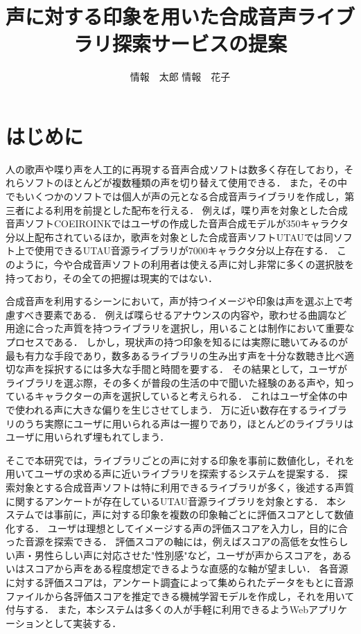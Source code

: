 \documentclass[a4j,8pt,twocolumn]{extarticle}
\title{声に対する印象を用いた合成音声ライブラリ探索サービスの提案}
\author{情報　太郎 \qquad 情報　花子}
\affiliation{情報大学情報学部}
\begin{document}
\maketitle
\thispagestyle{empty}	%


\section{はじめに}

人の歌声や喋り声を人工的に再現する音声合成ソフトは数多く存在しており，それらソフトのほとんどが複数種類の声を切り替えて使用できる．
また，その中でもいくつかのソフトでは個人が声の元となる合成音声ライブラリを作成し，第三者による利用を前提とした配布を行える．
例えば，喋り声を対象とした合成音声ソフトCOEIROINKではユーザの作成した音声合成モデルが350キャラクタ分以上配布されているほか\cite{mycoeiroink}，歌声を対象とした合成音声ソフトUTAUでは同ソフト上で使用できるUTAU音源ライブラリが7000キャラクタ分以上存在する\cite{vdbutau}．
このように，今や合成音声ソフトの利用者は使える声に対し非常に多くの選択肢を持っており，その全ての把握は現実的ではない．

合成音声を利用するシーンにおいて，声が持つイメージや印象は声を選ぶ上で考慮すべき要素である．
例えば喋らせるアナウンスの内容や，歌わせる曲調など用途に合った声質を持つライブラリを選択し，用いることは制作において重要なプロセスである．
しかし，現状声の持つ印象を知るには実際に聴いてみるのが最も有力な手段であり，数多あるライブラリの生み出す声を十分な数聴き比べ適切な声を採択するには多大な手間と時間を要する．
その結果として，ユーザがライブラリを選ぶ際，その多くが普段の生活の中で聞いた経験のある声や，知っているキャラクターの声を選択していると考えられる．
これはユーザ全体の中で使われる声に大きな偏りを生じさせてしまう．
万に近い数存在するライブラリのうち実際にユーザに用いられる声は一握りであり，ほとんどのライブラリはユーザに用いられず埋もれてしまう．

そこで本研究では，ライブラリごとの声に対する印象を事前に数値化し，それを用いてユーザの求める声に近いライブラリを探索するシステムを提案する．
探索対象とする合成音声ソフトは特に利用できるライブラリが多く，後述する声質に関するアンケートが存在しているUTAU音源ライブラリを対象とする．
本システムでは事前に，声に対する印象を複数の印象軸ごとに評価スコアとして数値化する．
ユーザは理想としてイメージする声の評価スコアを入力し，目的に合った音源を探索できる．
評価スコアの軸には，例えばスコアの高低を女性らしい声・男性らしい声に対応させた"性別感"など，ユーザが声からスコアを，あるいはスコアから声をある程度想定できるような直感的な軸が望ましい．
各音源に対する評価スコアは，アンケート調査によって集められたデータをもとに音源ファイルから各評価スコアを推定できる機械学習モデルを作成し，それを用いて付与する．
また，本システムは多くの人が手軽に利用できるようWebアプリケーションとして実装する．
\end{document}
